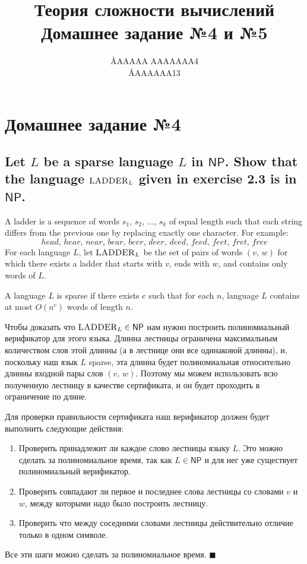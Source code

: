 \documentclass{article}
\title{Теория сложности вычислений \\ Домашнее задание №4 и №5}
\author{\AA{AAAAA AAAAAAA}{4} \\ \AA{AAAAAA}{13}}
\newcommand{\NP}{\ensuremath{\mathsf{NP}}}
\begin{document}
  \maketitle

  \setcounter{section}{3}
  \section{Домашнее задание №4}
  \setcounter{subsection}{10}
  \subsection{Let $L$ be a sparse language $L$ in \NP. Show that the language $\textsc{LADDER}_L$ given in exercise 2.3 is in \NP.}
  \begin{centerframebox}
    A ladder is a sequence of words $s_1,\, s_2,\, \dots,\, s_k$ of equal length such that each string differs from the previous one by replacing exactly one character.
    For example: $$head,\, hear,\, near,\, bear,\, beer,\, deer,\, deed,\, feed,\, feet,\, fret,\, free$$
    For each language $L$, let $\textsc{LADDER}_L$ be the set of pairs of words $(v,\, w)$ for which there exists a ladder that starts with $v$, ends with $w$, and contains only words of $L$. \vspace{5mm}

    A language $L$ is sparse if there exists c such that for each $n$, language $L$ contains at most $O(n^c)$ words of length $n$.
  \end{centerframebox}
  Чтобы доказать что $\textsc{LADDER}_L \in \NP$ нам нужно построить полиномиальный верификатор для этого языка.
  Длинна лестницы ограничена максимальным количеством слов этой длинны (а в лестнице они все одинаковой длинны), и, поскольку наш язык $L$ sparse, эта длинна будет полиномиальная относительно длинны входной пары слов $(v,\, w)$.
  Поэтому мы можем использовать всю полученную лестницу в качестве сертификата, и он будет проходить в ограничение по длине.

  \noindent
  Для проверки правильности сертификата наш верификатор должен будет выполнить следующие действия:
  \begin{enumerate}
    \item Проверить принадлежит ли каждое слово лестницы языку $L$. Это можно сделать за полиномиальное время, так как $L \in \NP$ и для нег уже существует полиномиальный верификатор.
    \item Проверить совпадают ли первое и последнее слова лестницы со словами $v$ и $w$, между которыми надо было построить лестницу.
    \item Проверить что между соседними словами лестницы действительно отличие только в одном символе.
  \end{enumerate}
  Все эти шаги можно сделать за полиномиальное время.
  $\blacksquare$
\end{document}
